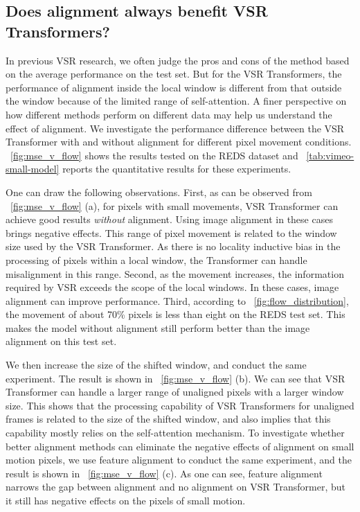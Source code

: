 \documentclass{article}
\begin{document}
\vspace{-2mm}
\subsection{Does alignment always benefit VSR Transformers?}
\label{sec:rethinking:msevsflow}
\vspace{-2mm}
In previous VSR research, we often judge the pros and cons of the method based on the average performance on the test set.
But for the VSR Transformers, the performance of alignment inside the local window is different from that outside the window because of the limited range of self-attention.
A finer perspective on how different methods perform on different data may help us understand the effect of alignment.
We investigate the performance difference between the VSR Transformer with and without alignment for different pixel movement conditions.
\figurename~\ref{fig:mse_v_flow} shows the results tested on the REDS dataset and \tablename~\ref{tab:vimeo-small-model} reports the quantitative results for these experiments.


One can draw the following observations.
First, as can be observed from \figurename~\ref{fig:mse_v_flow} (a), for pixels with small movements, VSR Transformer can achieve good results \emph{without} alignment.
Using image alignment in these cases brings negative effects.
This range of pixel movement is related to the window size used by the VSR Transformer.
As there is no locality inductive bias in the processing of pixels within a local window, the Transformer can handle misalignment in this range.
Second, as the movement increases, the information required by VSR exceeds the scope of the local windows.
In these cases, image alignment can improve performance.
Third, according to \figurename~\ref{fig:flow_distribution}, the movement of about 70\% pixels is less than eight on the REDS test set.
This makes the model without alignment still perform better than the image alignment on this test set.


We then increase the size of the shifted window, and conduct the same experiment.
The result is shown in \figurename~\ref{fig:mse_v_flow} (b).
We can see that VSR Transformer can handle a larger range of unaligned pixels with a larger window size.
This shows that the processing capability of VSR Transformers for unaligned frames is related to the size of the shifted window, and also implies that this capability mostly relies on the self-attention mechanism.
To investigate whether better alignment methods can eliminate the negative effects of alignment on small motion pixels, we use feature alignment to conduct the same experiment, and the result is shown in \figurename~\ref{fig:mse_v_flow} (c).
As one can see, feature alignment narrows the gap between alignment and no alignment on VSR Transformer, but it still has negative effects on the pixels of small motion.
\end{document}
